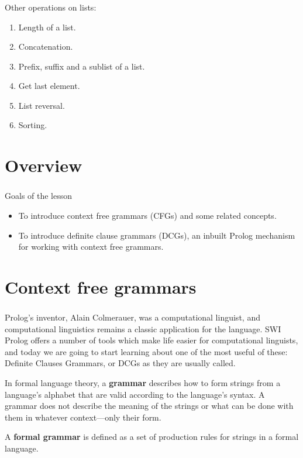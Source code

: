 \begin{frame}
	\frametitle{\insertsection}
	
	Other operations on lists:
	
	\begin{enumerate}
		\item Length of a list.
		\item Concatenation.
		\item Prefix, suffix and a sublist of a list.
		\item Get last element.
		\item List reversal.
		\item Sorting.
	\end{enumerate}
\end{frame}




\section{Overview}

\begin{frame}
	\frametitle{\insertsection}
	Goals of the lesson
	\begin{itemize}
		\item To introduce context free grammars (CFGs) and some related concepts.
		\item To introduce definite clause grammars (DCGs), an inbuilt Prolog mechanism	for working with context free grammars.
	\end{itemize}
\end{frame}


\section{Context free grammars}

\begin{frame}
	\frametitle{\insertsection}
	
	Prolog's inventor, Alain Colmerauer, was a computational linguist, and computational linguistics remains a classic application for
	the language. SWI Prolog offers a number of tools which make life easier for computational linguists, and today we are going to start
	learning about one of the most useful of these: Definite Clauses Grammars, or DCGs as they are usually called.
	
	In formal language theory, a \textbf{grammar} describes how to form strings from a language's alphabet that are valid according to the language's syntax. 
	A grammar does not describe the meaning of the strings or what can be done with them in whatever context—only their form. 
	
	A \textbf{formal grammar} is defined as a set of production rules for strings in a formal language.
	
\end{frame}



